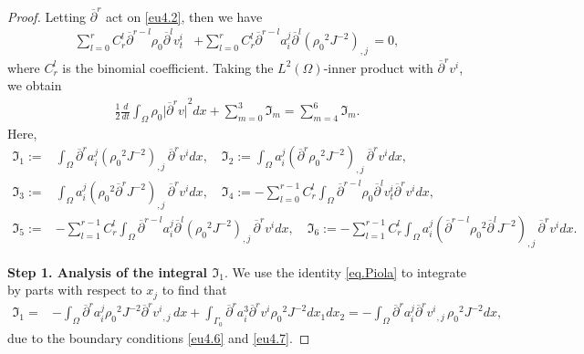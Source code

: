 \documentclass[12pt,twoside,reqno]{amsart}
\numberwithin{equation}{section}
\theoremstyle{definition}
\theoremstyle{remark}
\begin{document}
\begin{proof}
Letting ${\overline{\partial}}^r$ act on \eqref{eu4.2}, then we have
\begin{align*}
\sum_{l=0}^rC_r^l {\overline{\partial}}^{r-l}{\rho_0} {\overline{\partial}}^l v_t^i&+\sum_{l=0}^rC_r^l {\overline{\partial}}^{r-l}a^j_i{\overline{\partial}}^l {{{\left({\rho_0}^2  J^{-2}\right)}}_{,{j}}\,}=0,
\end{align*}
where $C_r^l$ is the binomial coefficient. Taking the $L^2(\Omega)$-inner product with ${\overline{\partial}}^r v^i$, we obtain
\begin{align}\label{eq.esthd4}
  \frac{1}{2}\frac{d}{dt}\int_\Omega {\rho_0} {\vert{{\overline{\partial}}^r v}\vert}^2dx +\sum_{m=0}^{3}{\mathfrak{I}}_m
  =\sum_{m=4}^6{\mathfrak{I}}_m.
\end{align}
Here,
\begin{align*}
  {\mathfrak{I}}_1:=&\int_\Omega {\overline{\partial}}^r a^j_i{{{\left({\rho_0}^2  J^{-2}\right)}}_{,{j}}\,}{\overline{\partial}}^r v^idx, \quad
  {\mathfrak{I}}_2:=\int_\Omega a^j_i{{{\left({\overline{\partial}}^r{\rho_0}^2  J^{-2}\right)}}_{,{j}}\,}{\overline{\partial}}^r v^idx,\\
  {\mathfrak{I}}_3:=&\int_\Omega a^j_i{{{\left({\rho_0}^2  {\overline{\partial}}^r J^{-2}\right)}}_{,{j}}\,}{\overline{\partial}}^r v^idx,\quad
  {\mathfrak{I}}_4:=-\sum_{l=0}^{r-1}C_r^l\int_\Omega {\overline{\partial}}^{r-l}{\rho_0} {\overline{\partial}}^l v_t^i{\overline{\partial}}^r v^idx,\\
  {\mathfrak{I}}_5:=&-\sum_{l=1}^{r-1}C_r^l\int_\Omega{\overline{\partial}}^{r-l}a^j_i{\overline{\partial}}^l {{{\left({\rho_0}^2  J^{-2}\right)}}_{,{j}}\,}{\overline{\partial}}^r v^idx,\quad
  {\mathfrak{I}}_6:=-\sum_{l=1}^{r-1}C_r^l\int_\Omega a^j_i{{{\left({\overline{\partial}}^{r-l}{\rho_0}^2  {\overline{\partial}}^l J^{-2}\right)}}_{,{j}}\,}{\overline{\partial}}^r v^idx.
\end{align*}

\textbf{Step 1. Analysis of the integral ${\mathfrak{I}}_1$}.
We use the identity \eqref{eq.Piola} to integrate by parts with respect to $x_j$  to find that
\begin{align*}
  {\mathfrak{I}}_1=&-\int_\Omega {\overline{\partial}}^r a^j_i{\rho_0}^2  J^{-2}{{{{\overline{\partial}}^r v^i}}_{,{j}}\,}dx +\int_{\Gamma_0} {\overline{\partial}}^r a^3_i{\overline{\partial}}^r v^i{\rho_0}^2  J^{-2}dx_1dx_2
  =-\int_\Omega {\overline{\partial}}^r a^j_i{{{{\overline{\partial}}^r v^i}}_{,{j}}\,}{\rho_0}^2  J^{-2}dx,
\end{align*}
due to the boundary conditions \eqref{eu4.6} and \eqref{eu4.7}.


\end{proof}
\end{document}
